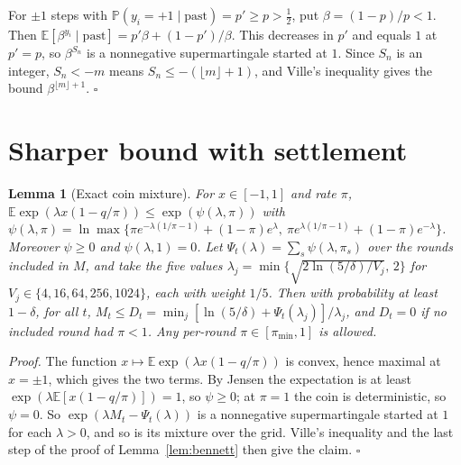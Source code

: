 \documentclass[10pt]{article}
\theoremstyle{plain}
\newtheorem{lemma}{Lemma}
\theoremstyle{definition}
\newcommand{\PP}{\mathbb{P}}
\newcommand{\E}{\mathbb{E}}
\begin{document}
For $\pm1$ steps with $\PP(y_i=+1\mid\text{past})=p'\ge p>\tfrac12$, put $\beta=(1-p)/p<1$. Then $\E[\beta^{y_i}\mid\text{past}]=p'\beta+(1-p')/\beta$. This decreases in $p'$ and equals $1$ at $p'=p$, so $\beta^{S_n}$ is a nonnegative supermartingale started at $1$. Since $S_n$ is an integer, $S_n<-m$ means $S_n\le-(\lfloor m\rfloor+1)$, and Ville's inequality gives the bound $\beta^{\lfloor m\rfloor+1}$. $\square$

\begin{table}[!htbp]
\caption{Proposition~\ref{prop:price}: simulated forced-rollback frequency in the first deployment spell against the ruin bound (2{,}000 runs per cell); $z$ is the excess over the bound in binomial standard errors, zero when below. Positive bounds displayed as 0.0000 are rounded to four decimal places.}\label{tab:prop4}\centering\small
\end{table}
\FloatBarrier

\section{Sharper bound with settlement}\label{app:v2}
\begin{lemma}[Exact coin mixture]\label{lem:coin}
For $x\in[-1,1]$ and rate $\pi$, $\E\exp(\lambda x(1-q/\pi))\le\exp(\psi(\lambda,\pi))$ with $\psi(\lambda,\pi)=\ln\max\{\pi e^{-\lambda(1/\pi-1)}+(1-\pi)e^{\lambda},\ \pi e^{\lambda(1/\pi-1)}+(1-\pi)e^{-\lambda}\}$. Moreover $\psi\ge0$ and $\psi(\lambda,1)=0$. Let $\Psi_t(\lambda)=\sum_s\psi(\lambda,\pi_s)$ over the rounds included in $M$, and take the five values $\lambda_j=\min\{\sqrt{2\ln(5/\delta)/V_j},\,2\}$ for $V_j\in\{4,16,64,256,1024\}$, each with weight $1/5$. Then with probability at least $1-\delta$, for all $t$, $M_t\le D_t=\min_j[\ln(5/\delta)+\Psi_t(\lambda_j)]/\lambda_j$, and $D_t=0$ if no included round had $\pi<1$. Any per-round $\pi\in[\pi_{\min},1]$ is allowed.
\end{lemma}
\emph{Proof.} The function $x\mapsto\E\exp(\lambda x(1-q/\pi))$ is convex, hence maximal at $x=\pm1$, which gives the two terms. By Jensen the expectation is at least $\exp(\lambda\E[x(1-q/\pi)])=1$, so $\psi\ge0$; at $\pi=1$ the coin is deterministic, so $\psi=0$. So $\exp(\lambda M_t-\Psi_t(\lambda))$ is a nonnegative supermartingale started at $1$ for each $\lambda>0$, and so is its mixture over the grid. Ville's inequality and the last step of the proof of Lemma~\ref{lem:bennett} then give the claim. $\square$
\end{document}
